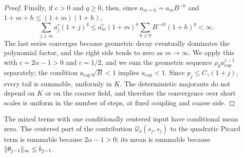 \begin{proof}
Finally, if $c>0$ and $q\ge0$, then, since $a_{m+h}=a_mB^{-h}$ and $1+m+h\le(1+m)(1+h)$,
\[
 \sum_{j\ge m}a_j^c(1+j)^q\le a_m^c(1+m)^q\sum_{h\ge0}B^{-ch}(1+h)^q<\infty.
\]
The last series converges because geometric decay eventually dominates the polynomial factor, and the right side tends to zero as $m\to\infty$. We apply this with $c=2\alpha-1>0$ and $c=1/2$, and we sum the geometric sequence $\rho_0a_{\mathrm{cap}}^{j-1}$ separately; the condition $a_{\mathrm{cap}}\sqrt B<1$ implies $a_{\mathrm{cap}}<1$. Since $p_j\le C_\gamma(1+j)$, every tail is summable, uniformly in $K$. The deterministic majorants do not depend on $K$ or on the coarser field, and therefore the convergence over short scales is uniform in the number of steps, at fixed coupling and coarse side.
\end{proof}

\begin{remark}\label{ch23:rem:centering-scope}
The mixed terms with one conditionally centered input have conditional mean zero. The centered part of the contribution $\mathcal Q_\delta(s_j,s_j)$ to the quadratic Picard term is summable because $2\alpha-1>0$; its mean is summable because $\lVert \theta_{j-1}\rVert_\infty\le b_{j-1}$.
\end{remark}
